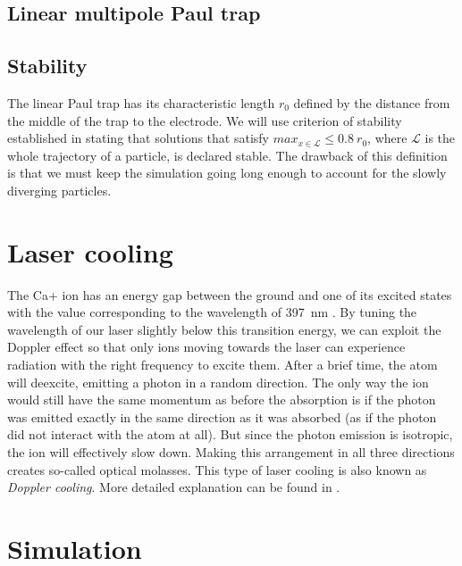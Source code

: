 \subsection{Linear multipole Paul trap}

\subsection{Stability}

The linear Paul trap has its characteristic length $r_0$ defined by the distance from the middle of the trap to the electrode. We will use criterion of stability established in \cite{gerlich1992inhomogeneous} stating that solutions that satisfy $max_{x \in \mathcal{L}} \leq 0.8 \ r_0$, where $\mathcal{L}$ is the whole trajectory of a particle, is declared stable. The drawback of this definition is that we must keep the simulation going long enough to account for the slowly diverging particles.

\section{Laser cooling} 

The Ca+ ion has an energy gap between the ground and one of its excited states with the value corresponding to the wavelength of \SI{397}{\nano\meter} \cite{urabe1993laser}. By tuning the wavelength of our laser slightly below this transition energy, we can exploit the Doppler effect so that only ions moving towards the laser can experience radiation with the right frequency to excite them. After a brief time, the atom will deexcite, emitting a photon in a random direction. The only way the ion would still have the same momentum as before the absorption is if the photon was emitted exactly in the same direction as it was absorbed (as if the photon did not interact with the atom at all). But since the photon emission is isotropic, the ion will effectively slow down. Making this arrangement in all three directions creates so-called optical molasses. This type of laser cooling is also known as \emph{Doppler cooling}. More detailed explanation can be found in \cite{alma990008711500106986}.  
 
	
\section{Simulation}
\label{simulation}

